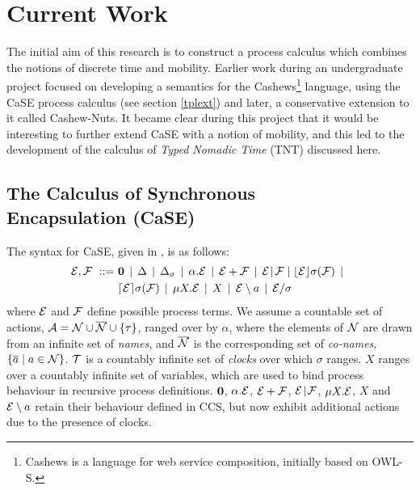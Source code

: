 \chapter{Current Work}
\label{currentwork}

The initial aim of this research is to construct a process calculus which
combines the notions of discrete time and mobility.  Earlier work
during an undergraduate project focused on developing a semantics for
the Cashews\footnote{Cashews is a language for web service
  composition, initially based on OWL-S.}\cite{cashews-sem} language,
using the CaSE process calculus (see section \ref{tplext}) and later,
a conservative extension to it called Cashew-Nuts.  It became clear
during this project that it would be interesting to further extend CaSE
with a notion of mobility, and this led to the development of the
calculus of \emph{Typed Nomadic Time} (TNT) discussed here.

\section{The Calculus of Synchronous \\ Encapsulation (CaSE)}
\label{case}

The syntax for CaSE, given in \cite{norton05alg}, is as follows:
\begin{equation}
  \begin{aligned}
    \text{$\mathcal{E}$}, \text{$\mathcal{F}$}\ ::=\ &
    \textbf{0}  \;\,|\,\; 
    \Delta \;\,|\,\; 
    \Delta_{\sigma} \;\,|\,\; 
    \alpha . \text{$\mathcal{E}$}  \;\,|\,\;
    \text{$\mathcal{E}$} + \text{$\mathcal{F}$} \;\,|\,\; 
   \text{$\mathcal{E}$} \mathrel{\!|\!} \text{$\mathcal{F}$} \mid
    \lfloor{\text{$\mathcal{E}$}}\rfloor {\sigma} ({\text{$\mathcal{F}$}}) \;\,|\,\; \\
    & \lceil{\text{$\mathcal{E}$}}\rceil {\sigma} ({\text{$\mathcal{F}$}}) \;\,|\,\; 
    \mu X . \text{$\mathcal{E}$} \;\,|\,\; 
    X \;\,|\,\; 
    \text{$\mathcal{E}$} \setminus a \;\,|\,\; 
    \text{$\mathcal{E}$} / \sigma
  \end{aligned}
\end{equation}
where $\text{$\mathcal{E}$}$ and $\text{$\mathcal{F}$}$ define possible process terms. We assume a
countable set of actions, $\text{$\mathcal{A}$} = \text{$\mathcal{N}$} \cup \text{$\overline{\text{$\mathcal{N}$}}$} \cup
\{\tau\}$, ranged over by $\alpha$, where the elements of $\text{$\mathcal{N}$}$ are
drawn from an infinite set of \emph{names}, and $\text{$\overline{\text{$\mathcal{N}$}}$}$ is the
corresponding set of \emph{co-names}, $\{\overline{a} \mid a \in
\text{$\mathcal{N}$}\}$. $\text{$\mathcal{T}$}$ is a countably infinite set of \emph{clocks} over
which $\sigma$ ranges. $X$ ranges over a countably infinite set of variables, which are used to bind process
behaviour in recursive process definitions. $\textbf{0}$, $\alpha . \text{$\mathcal{E}$}$,
$\text{$\mathcal{E}$} + \text{$\mathcal{F}$}$, $\text{$\mathcal{E}$} \mathrel{\!|\!} \text{$\mathcal{F}$}$, $\mu X
. \text{$\mathcal{E}$}$, $X$ and $\text{$\mathcal{E}$} \setminus a$ retain their behaviour defined in
CCS, but now exhibit additional actions due to the presence of clocks.

